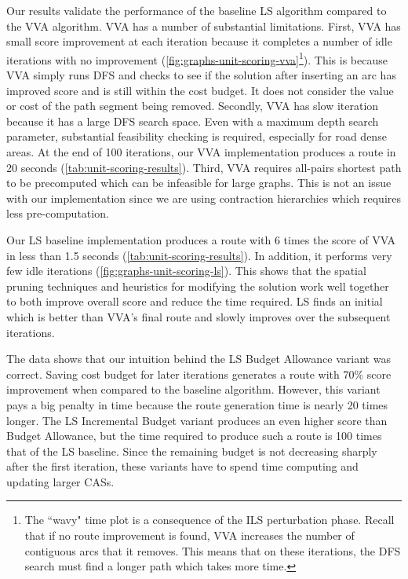 \documentclass[honors]{union-cs-thesis}
\begin{document}
Our results validate the performance of the baseline LS algorithm compared to the VVA algorithm. VVA has a number of substantial limitations. First, VVA has small score improvement at each iteration because it completes a number of idle iterations with no improvement (\cref{fig:graphs-unit-scoring-vva}\footnote{The ``wavy" time plot is a consequence of the ILS perturbation phase. Recall that if no route improvement is found, VVA increases the number of contiguous arcs that it removes. This means that on these iterations, the DFS search must find a longer path which takes more time.}). This is because VVA simply runs DFS and checks to see if the solution after inserting an arc has improved score and is still within the cost budget. It does not consider the value or cost of the path segment being removed. Secondly, VVA has slow iteration because it has a large DFS search space. Even with a maximum depth search parameter, substantial feasibility checking is required, especially for road dense areas. At the end of 100 iterations, our VVA implementation produces a route in 20 seconds (\cref{tab:unit-scoring-results}). Third, VVA requires all-pairs shortest path to be precomputed which can be infeasible for large graphs. This is not an issue with our implementation since we are using contraction hierarchies which requires less pre-computation. 

Our LS baseline implementation produces a route with 6 times the score of VVA in less than 1.5 seconds (\cref{tab:unit-scoring-results}). In addition, it performs very few idle iterations (\cref{fig:graphs-unit-scoring-ls}). This shows that the spatial pruning techniques and heuristics for modifying the solution work well together to both improve overall score and reduce the time required. LS finds an initial which is better than VVA's final route and slowly improves over the subsequent iterations.

The data shows that our intuition behind the LS Budget Allowance variant was correct. Saving cost budget for later iterations generates a route with 70\% score improvement when compared to the baseline algorithm. However, this variant pays a big penalty in time because the route generation time is nearly 20 times longer. The LS Incremental Budget variant produces an even higher score than Budget Allowance, but the time required to produce such a route is 100 times that of the LS baseline. Since the remaining budget is not decreasing sharply after the first iteration, these variants have to spend time computing and updating larger CASs.
\end{document}
